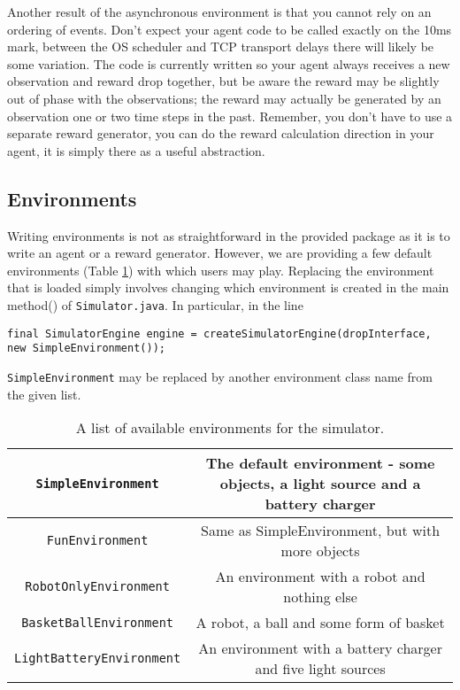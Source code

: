\documentclass[12pt]{article}
\newcommand{\code}[1]{\texttt{#1}}
\begin{document}
Another result of the asynchronous environment is that you cannot rely on an ordering of events.  Don't expect your agent code to be called exactly on the 10ms mark, between the OS scheduler and TCP transport delays there will likely be some variation.  The code is currently written so your agent always receives a new observation and reward drop together, but be aware the reward may be slightly out of phase with the observations; the reward may actually be generated by an observation one or two time steps in the past.  Remember, you don't have to use a separate reward generator, you can do the reward calculation direction in your agent, it is simply there as a useful abstraction.

\subsection{Environments}

Writing environments is not as straightforward in the provided package as it
is to write an agent or a reward generator. However, we are providing a few
default environments (Table \ref{table:environment_list}) with which users may 
play. Replacing the environment that is loaded simply involves changing 
which environment is created in the main method() of \verb+Simulator.java+.
In particular, in the line

\begin{verbatim}
final SimulatorEngine engine = createSimulatorEngine(dropInterface, new SimpleEnvironment());
\end{verbatim}

\verb+SimpleEnvironment+ may be replaced by another environment class name
from the given list.

\begin{table}
\begin{tabular}{|c|c|}
\hline
\code{SimpleEnvironment} & The default environment - some objects, a light source and a battery charger \\
\hline
\code{FunEnvironment} & Same as SimpleEnvironment, but with more objects \\
\hline
\code{RobotOnlyEnvironment} & An environment with a robot and nothing else \\
\hline
\code{BasketBallEnvironment} & A robot, a ball and some form of basket \\
\hline
\code{LightBatteryEnvironment} & An environment with a battery charger and five light sources \\ 
\hline
\end{tabular}
\caption{A list of available environments for the simulator.\label{table:environment_list}}
\end{table}
\end{document}
